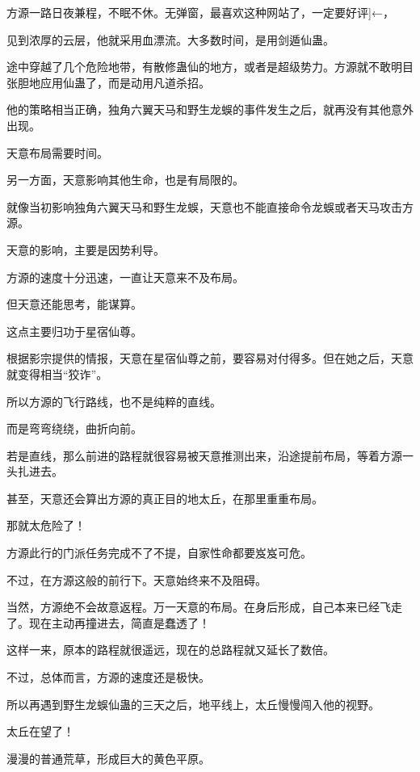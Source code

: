 
\begin{this_body}

方源一路日夜兼程，不眠不休。无弹窗，最喜欢这种网站了，一定要好评]←，

见到浓厚的云层，他就采用血漂流。大多数时间，是用剑遁仙蛊。

途中穿越了几个危险地带，有散修蛊仙的地方，或者是超级势力。方源就不敢明目张胆地应用仙蛊了，而是动用凡道杀招。

他的策略相当正确，独角六翼天马和野生龙蜈的事件发生之后，就再没有其他意外出现。

天意布局需要时间。

另一方面，天意影响其他生命，也是有局限的。

就像当初影响独角六翼天马和野生龙蜈，天意也不能直接命令龙蜈或者天马攻击方源。

天意的影响，主要是因势利导。

方源的速度十分迅速，一直让天意来不及布局。

但天意还能思考，能谋算。

这点主要归功于星宿仙尊。

根据影宗提供的情报，天意在星宿仙尊之前，要容易对付得多。但在她之后，天意就变得相当“狡诈”。

所以方源的飞行路线，也不是纯粹的直线。

而是弯弯绕绕，曲折向前。

若是直线，那么前进的路程就很容易被天意推测出来，沿途提前布局，等着方源一头扎进去。

甚至，天意还会算出方源的真正目的地太丘，在那里重重布局。

那就太危险了！

方源此行的门派任务完成不了不提，自家性命都要岌岌可危。

不过，在方源这般的前行下。天意始终来不及阻碍。

当然，方源绝不会故意返程。万一天意的布局。在身后形成，自己本来已经飞走了。现在主动再撞进去，简直是蠢透了！

这样一来，原本的路程就很遥远，现在的总路程就又延长了数倍。

不过，总体而言，方源的速度还是极快。

所以再遇到野生龙蜈仙蛊的三天之后，地平线上，太丘慢慢闯入他的视野。

太丘在望了！

漫漫的普通荒草，形成巨大的黄色平原。


\end{this_body}
